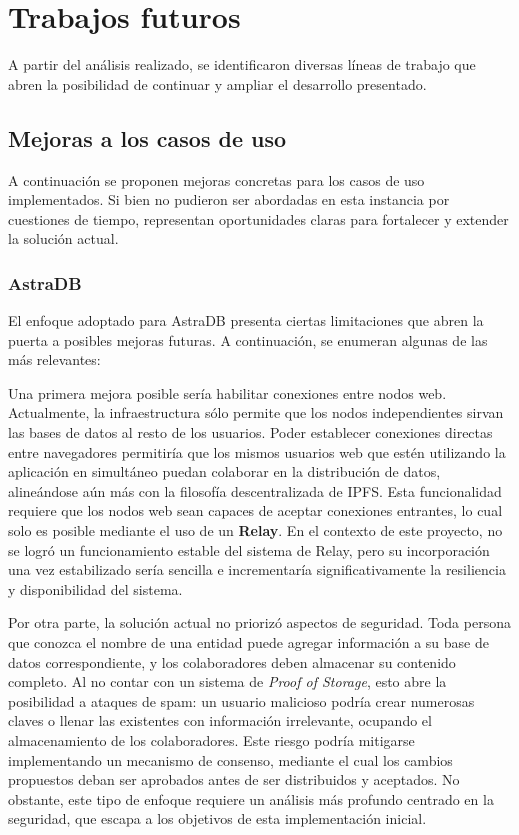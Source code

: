 \section{Trabajos futuros}

A partir del análisis realizado, se identificaron diversas líneas de trabajo que abren la posibilidad de continuar y ampliar el desarrollo presentado.

\subsection{Mejoras a los casos de uso}

A continuación se proponen mejoras concretas para los casos de uso implementados. Si bien no pudieron ser abordadas en esta instancia por cuestiones de tiempo, representan oportunidades claras para fortalecer y extender la solución actual.

\subsubsection{AstraDB}

El enfoque adoptado para AstraDB presenta ciertas limitaciones que abren la puerta a posibles mejoras futuras. A continuación, se enumeran algunas de las más relevantes:

Una primera mejora posible sería habilitar conexiones entre nodos web. Actualmente, la infraestructura sólo permite que los nodos independientes sirvan las bases de datos al resto de los usuarios. Poder establecer conexiones directas entre navegadores permitiría que los mismos usuarios web que estén utilizando la aplicación en simultáneo puedan colaborar en la distribución de datos, alineándose aún más con la filosofía descentralizada de IPFS. Esta funcionalidad requiere que los nodos web sean capaces de aceptar conexiones entrantes, lo cual solo es posible mediante el uso de un \textbf{Relay}. En el contexto de este proyecto, no se logró un funcionamiento estable del sistema de Relay, pero su incorporación una vez estabilizado sería sencilla e incrementaría significativamente la resiliencia y disponibilidad del sistema.

Por otra parte, la solución actual no priorizó aspectos de seguridad. Toda persona que conozca el nombre de una entidad puede agregar información a su base de datos correspondiente, y los colaboradores deben almacenar su contenido completo. Al no contar con un sistema de \textit{Proof of Storage}, esto abre la posibilidad a ataques de spam: un usuario malicioso podría crear numerosas claves o llenar las existentes con información irrelevante, ocupando el almacenamiento de los colaboradores. Este riesgo podría mitigarse implementando un mecanismo de consenso, mediante el cual los cambios propuestos deban ser aprobados antes de ser distribuidos y aceptados. No obstante, este tipo de enfoque requiere un análisis más profundo centrado en la seguridad, que escapa a los objetivos de esta implementación inicial.

